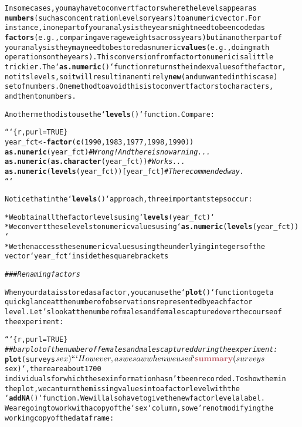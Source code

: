 \documentclass{article}\usepackage[]{graphicx}\usepackage[]{xcolor}
\makeatletter
\newcommand{\hlcom}[1]{\textcolor[rgb]{0.678,0.584,0.686}{\textit{#1}}}%
\newcommand{\hlkwd}[1]{\textcolor[rgb]{0.737,0.353,0.396}{\textbf{#1}}}%
\newenvironment{kframe}{%
 \def\at@end@of@kframe{}%
 \ifinner\ifhmode%
  \def\at@end@of@kframe{\end{minipage}}%
  \begin{minipage}{\columnwidth}%
 \fi\fi%
 \def\FrameCommand##1{\hskip\@totalleftmargin \hskip-\fboxsep
 \colorbox{shadecolor}{##1}\hskip-\fboxsep
     \hskip-\linewidth \hskip-\@totalleftmargin \hskip\columnwidth}%
 \MakeFramed {\advance\hsize-\width
   \@totalleftmargin\z@ \linewidth\hsize
   \@setminipage}}%
 {\par\unskip\endMakeFramed%
 \at@end@of@kframe}
\newenvironment{knitrout}{}{} %
\makeatother
\begin{document}
\begin{knitrout}
\begin{kframe}
\begin{alltt}
In some cases, you may have to convert factors where the levels appear as
\hlkwd{numbers} (such as concentration levels or years) to a numeric vector. For
instance, in one part of your analysis the years might need to be encoded as
\hlkwd{factors} (e.g., comparing average weights across years) but in another part of
your analysis they may need to be stored as numeric \hlkwd{values} (e.g., doing math
operations on the years). This conversion from factor to numeric is a little
trickier. The `\hlkwd{as.numeric}()` function returns the index values of the factor,
not its levels, so it will result in an entirely \hlkwd{new} (and unwanted in this case)
set of numbers. One method to avoid this is to convert factors to characters,
and then to numbers.

Another method is to use the `\hlkwd{levels}()` function. Compare:

```\{r, purl=TRUE\}
year_fct <- \hlkwd{factor}(\hlkwd{c}(1990, 1983, 1977, 1998, 1990))
\hlkwd{as.numeric}(year_fct)               \hlcom{# Wrong! And there is no warning...}
\hlkwd{as.numeric}(\hlkwd{as.character}(year_fct)) \hlcom{# Works...}
\hlkwd{as.numeric}(\hlkwd{levels}(year_fct))[year_fct]    \hlcom{# The recommended way.}
```

Notice that in the `\hlkwd{levels}()` approach, three important steps occur:

* We obtain all the factor levels using `\hlkwd{levels}(year_fct)`
* We convert these levels to numeric values using `\hlkwd{as.numeric}(\hlkwd{levels}(year_fct))`
* We then access these numeric values using the underlying integers of the
  vector `year_fct` inside the square brackets

\hlcom{### Renaming factors}

When your data is stored as a factor, you can use the `\hlkwd{plot}()` function to get a
quick glance at the number of observations represented by each factor
level. Let's look at the number of males and females captured over the course of
the experiment:

```\{r, purl=TRUE\}
\hlcom{## bar plot of the number of females and males captured during the experiment:}
\hlkwd{plot}(surveys$sex)
```

However, as we saw when we used `\hlkwd{summary}(surveys$sex)`, there are about 1700 
individuals for which the sex information hasn't been recorded. To show them in
the plot, we can turn the missing values into a factor level with the 
`\hlkwd{addNA}()` function. We will also have to give the new factor level a label.
We are going to work with a copy of the `sex` column, so we're not modifying the 
working copy of the data frame:


\end{alltt}
\end{kframe}
\end{knitrout}
\end{document}
